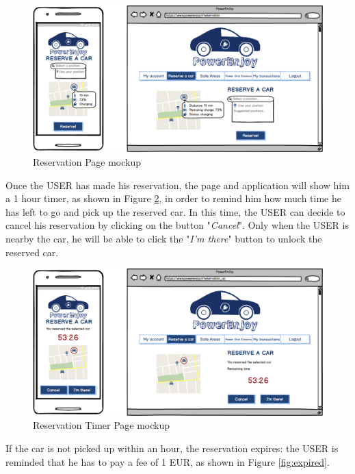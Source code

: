 \vspace{80pt}

\begin{figure}[htbp]
\centering
\includegraphics[width=\textwidth]{Images/Mockups/Reservation}
\caption{Reservation Page mockup}
\label{fig:reservation}
\end{figure}
\clearpage

Once the USER has made his reservation, the page and application will show him a 1 hour timer, as shown in Figure \ref{fig:timer}, in order to remind him how much time he has left to go and pick up the reserved car. In this time, the USER can decide to cancel his reservation by clicking on the button "\textit{Cancel}". Only when the USER is nearby the car, he will be able to click the "\textit{I'm there}" button to unlock the reserved car.

\vspace{80pt}

\begin{figure}[htbp]
\centering
\includegraphics[width=\textwidth]{Images/Mockups/Timer}
\caption{Reservation Timer Page mockup}
\label{fig:timer}
\end{figure}
\clearpage

If the car is not picked up within an hour, the reservation expires: the USER is reminded that he has to pay a fee of 1 EUR, as shown in Figure \ref{fig:expired}.

